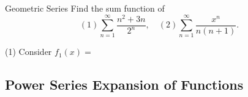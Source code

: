 \begin{example}{Geometric Series}{}
  Find the sum function of
  \begin{equation}
    (1) \sum\limits_{n = 1}^{\infty} \frac{n^2 + 3n}{2^n}, \quad
    (2) \sum\limits_{n = 1}^{\infty} \frac{x^n}{n(n+1)}.
  \end{equation}
\end{example}

\begin{solution}
  (1) Consider $f_1(x) = $
\end{solution}


\subsection{Power Series Expansion of Functions}




